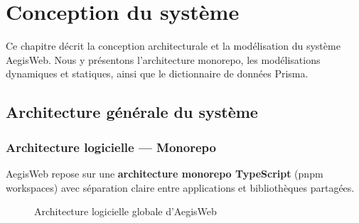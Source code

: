 \chapter{Conception du système}

\begin{chapintro}
Ce chapitre décrit la conception architecturale et la modélisation du
système AegisWeb. Nous y présentons l'architecture monorepo, les
modélisations dynamiques et statiques, ainsi que le dictionnaire de
données Prisma.
\end{chapintro}

\section{Architecture générale du système}

\subsection{Architecture logicielle — Monorepo}

AegisWeb repose sur une \textbf{architecture monorepo TypeScript} (pnpm
workspaces) avec séparation claire entre applications et bibliothèques
partagées.

\begin{figure}[H]
\centering
{}
\caption{Architecture logicielle globale d'AegisWeb}
\label{fig:archi_global}
\end{figure}

